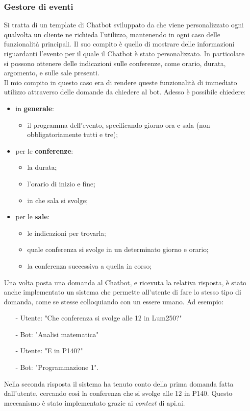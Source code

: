 \subsubsection{Gestore di eventi}
Si tratta di un template di \gls{Chatbot} sviluppato da \azienda{} che viene  personalizzato ogni qualvolta un cliente ne richieda l'utilizzo, mantenendo in ogni caso delle funzionalità principali. Il suo compito è quello di mostrare delle informazioni riguardanti l'evento per il quale il \gls{Chatbot} è stato personalizzato. In particolare si possono ottenere delle indicazioni sulle conferenze, come orario, durata, argomento, e sulle sale presenti.\\
Il mio compito in questo caso era di rendere queste funzionalità di immediato utilizzo attraverso delle domande da chiedere al bot. Adesso è possibile chiedere:
\begin{itemize}
	\item in \textbf{generale}:
	\begin{itemize}
		\item il programma dell'evento, specificando giorno ora e sala (non obbligatoriamente tutti e tre);
	\end{itemize}
	\item per le \textbf{conferenze}:
	\begin{itemize}
		\item la durata;
		\item l'orario di inizio e fine;
		\item in che sala si svolge;
	\end{itemize}
	\item per le \textbf{sale}:
	\begin{itemize}
		\item le indicazioni per trovarla;
		\item quale conferenza si svolge in un determinato giorno e orario;
		\item la conferenza successiva a quella in corso;
	\end{itemize}
\end{itemize}

Una volta posta una domanda al \gls{Chatbot}, e ricevuta la relativa risposta, è stato anche implementato un sistema che permette all'utente di fare lo stesso tipo di domanda, come se stesse colloquiando con un essere umano. Ad esempio:

\begin{itemize}
	\item[-] Utente: "Che conferenza si svolge alle 12 in Lum250?"
	\item[-] Bot: "Analisi matematica"
	\item[-] Utente: "E in P140?"
	\item[-] Bot: "Programmazione 1".
\end{itemize}
Nella seconda risposta il sistema ha tenuto conto della prima domanda fatta dall'utente, cercando così la conferenza che si svolge alle 12 in P140. Questo meccanismo è stato implementato grazie ai \emph{context} di api.ai.

